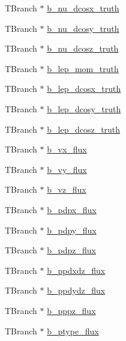 \begin{DoxyCompactItemize}
\item 
T\-Branch $\ast$ \hyperlink{classanatree_aade18245efa8cc10cdad1b45b928491c}{b\-\_\-nu\-\_\-dcosx\-\_\-truth}
\item 
T\-Branch $\ast$ \hyperlink{classanatree_aa937bf9c02bab49e5f07de8ce5f359a8}{b\-\_\-nu\-\_\-dcosy\-\_\-truth}
\item 
T\-Branch $\ast$ \hyperlink{classanatree_ab94db41a77a084076e4f394da09c377f}{b\-\_\-nu\-\_\-dcosz\-\_\-truth}
\item 
T\-Branch $\ast$ \hyperlink{classanatree_a46fc39330907911f95de958e933bfd53}{b\-\_\-lep\-\_\-mom\-\_\-truth}
\item 
T\-Branch $\ast$ \hyperlink{classanatree_aa8a950a15fa3163249d5632e9f7725e3}{b\-\_\-lep\-\_\-dcosx\-\_\-truth}
\item 
T\-Branch $\ast$ \hyperlink{classanatree_a567f358e0f5d8cca212cb0ddcf2734f8}{b\-\_\-lep\-\_\-dcosy\-\_\-truth}
\item 
T\-Branch $\ast$ \hyperlink{classanatree_af604029e402633b38d303c9d7dcad55a}{b\-\_\-lep\-\_\-dcosz\-\_\-truth}
\item 
T\-Branch $\ast$ \hyperlink{classanatree_a08d4c12d2e8cb9cdfcc427b5bedfd39e}{b\-\_\-vx\-\_\-flux}
\item 
T\-Branch $\ast$ \hyperlink{classanatree_a8cbcbb5828c9c6cc2123b740ae53f403}{b\-\_\-vy\-\_\-flux}
\item 
T\-Branch $\ast$ \hyperlink{classanatree_a56781e9f7ca91c1884358303ce0d07f2}{b\-\_\-vz\-\_\-flux}
\item 
T\-Branch $\ast$ \hyperlink{classanatree_a620f8a57b70fa1dc92cdebfbe6c4438d}{b\-\_\-pdpx\-\_\-flux}
\item 
T\-Branch $\ast$ \hyperlink{classanatree_a3983ebdfaf438e8d02cb380f23134e8d}{b\-\_\-pdpy\-\_\-flux}
\item 
T\-Branch $\ast$ \hyperlink{classanatree_a6a5cc8661dd7053144fbce7c494aa641}{b\-\_\-pdpz\-\_\-flux}
\item 
T\-Branch $\ast$ \hyperlink{classanatree_a115f3fa619deb7e0c7322c0fccc5ee05}{b\-\_\-ppdxdz\-\_\-flux}
\item 
T\-Branch $\ast$ \hyperlink{classanatree_a0b9060b468862d407a67123aaa6c069c}{b\-\_\-ppdydz\-\_\-flux}
\item 
T\-Branch $\ast$ \hyperlink{classanatree_a497c5c18f0ea0abb3017435c086d3902}{b\-\_\-pppz\-\_\-flux}
\item 
T\-Branch $\ast$ \hyperlink{classanatree_a06e55a0dc9b6e04d2d7f452b455996b8}{b\-\_\-ptype\-\_\-flux}
\item 

\end{DoxyCompactItemize}

